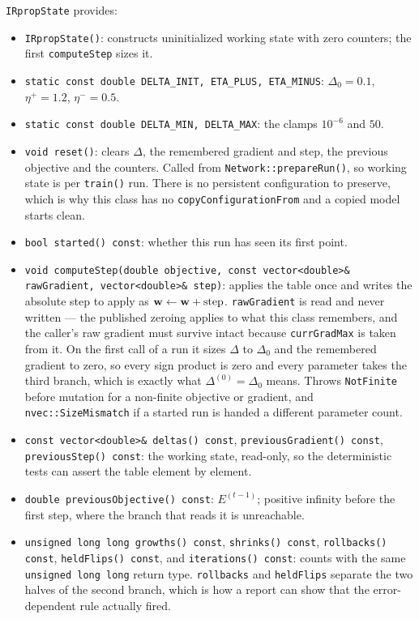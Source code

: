 \texttt{IRpropState} provides:

\begin{itemize}
\item \texttt{IRpropState()}: constructs uninitialized working state with zero
      counters; the first \texttt{computeStep} sizes it.
\item \texttt{static const double DELTA\_INIT, ETA\_PLUS, ETA\_MINUS}:
      $\Delta_0 = 0.1$, $\eta^{+} = 1.2$, $\eta^{-} = 0.5$.
\item \texttt{static const double DELTA\_MIN, DELTA\_MAX}: the clamps
      $10^{-6}$ and $50$.
\item \texttt{void reset()}: clears $\Delta$, the remembered gradient and step,
      the previous objective and the counters.  Called from
      \texttt{Network::prepareRun()}, so working state is per \texttt{train()}
      run.  There is no persistent configuration to preserve, which is why this
      class has no \texttt{copyConfigurationFrom} and a copied model starts
      clean.
\item \texttt{bool started() const}: whether this run has seen its first point.
\item \texttt{void computeStep(double objective, const vector<double>\&
      rawGradient, vector<double>\& step)}: applies the table once and writes
      the absolute step to apply as ${\bf w} \leftarrow {\bf w} + \mathrm{step}$.
      \texttt{rawGradient} is read and never written --- the published zeroing
      applies to what this class remembers, and the caller's raw gradient must
      survive intact because \texttt{currGradMax} is taken from it.  On the
      first call of a run it sizes $\Delta$ to $\Delta_0$ and the remembered
      gradient to zero, so every sign product is zero and every parameter takes
      the third branch, which is exactly what $\Delta^{(0)} = \Delta_0$ means.
      Throws \texttt{NotFinite} before mutation for a non-finite objective or
      gradient, and \texttt{nvec::SizeMismatch} if a started run is handed a
      different parameter count.
\item \texttt{const vector<double>\& deltas() const}, \texttt{previousGradient()
      const}, \texttt{previousStep() const}: the working state, read-only, so
      the deterministic tests can assert the table element by element.
\item \texttt{double previousObjective() const}: $E^{(t-1)}$; positive infinity
      before the first step, where the branch that reads it is unreachable.
\item \texttt{unsigned long long growths() const},
      \texttt{shrinks() const}, \texttt{rollbacks() const},
      \texttt{heldFlips() const}, and \texttt{iterations() const}: counts with
      the same \texttt{unsigned long long} return type. \texttt{rollbacks} and
      \texttt{heldFlips}
      separate the two halves of the second branch, which is how a report can
      show that the error-dependent rule actually fired.
\end{itemize}

